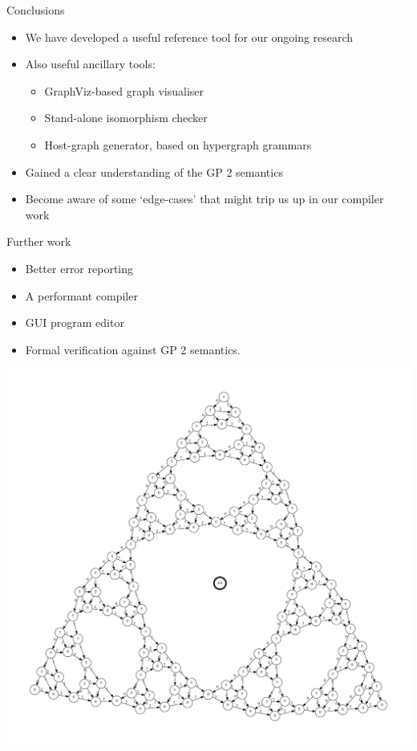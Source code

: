\begin{frame}{Conclusions}

\begin{itemize}
\itemsep1pt\parskip0pt
\item
  We have developed a useful reference tool for our ongoing research
\item
  Also useful ancillary tools:

  \begin{itemize}
  \itemsep1pt\parskip0pt
  \item
    GraphViz-based graph visualiser
  \item
    Stand-alone isomorphism checker
  \item
    Host-graph generator, based on hypergraph grammars 
  \end{itemize}
\item
  Gained a clear understanding of the GP 2 semantics
\item
  Become aware of some `edge-cases' that might trip us up in our
  compiler work 
\end{itemize}

\end{frame}

\begin{frame}{Further work}

\begin{itemize}
\itemsep1pt\parskip0pt
\item
  Better error reporting
\item
  A performant compiler 
\item
  GUI program editor
\item
  Formal verification against GP 2 semantics. 
\end{itemize}

\begin{center}
\includegraphics[scale=0.2]{gp2graph_9CRkVV.pdf}
\end{center}

\end{frame}

